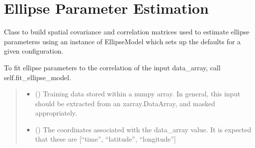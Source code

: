 \documentclass[letterpaper,10pt,english]{sphinxmanual}
\begin{document}
\section{Ellipse Parameter Estimation}
\label{\detokenize{ellipse:ellipse-parameter-estimation}}

\begin{fulllineitems}
\label{\detokenize{ellipse:glomar_gridding.ellipse.EllipseBuilder}}
\pysigstartsignatures
\pysiglinewithargsret
{}
{\sphinxparamcomma {}}
{}
\pysigstopsignatures
\sphinxAtStartPar
Class to build spatial covariance and correlation matrices used to estimate
ellipse parameterss using an instance of EllipseModel which sets up the
defaults for a given configuration.

\sphinxAtStartPar
To fit ellipse parameters to the correlation of the input data\_array, call
self.fit\_ellipse\_model.
\begin{quote}\begin{description}
\begin{itemize}
\item {}
\sphinxAtStartPar
{} (\sphinxstyleliteralemphasis{\sphinxupquote{ | }}) \textendash{} Training data stored within a numpy array. In general, this input should
be extracted from an xarray.DataArray, and masked appropriately.

\item {}
\sphinxAtStartPar
{} () \textendash{} The coordinates associated with the data\_array value. It is expected
that these are {[}“time”, “latitude”, “longitude”{]}

\end{itemize}

\end{description}\end{quote}


\end{fulllineitems}
\end{document}
